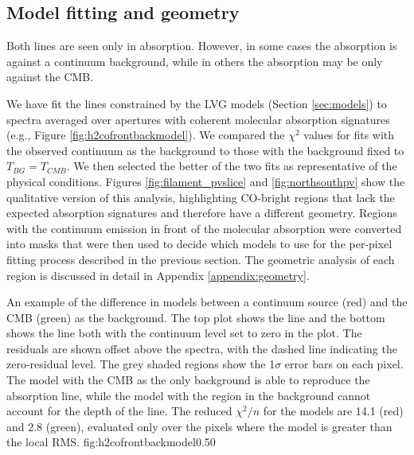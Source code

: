 \subsection{Model fitting and geometry}
\label{sec:geometry}
Both \formaldehyde lines are seen only in absorption.  However, in some cases
the absorption is against a continuum background, while in others the
absorption may be only against the CMB.

We have fit the \formaldehyde lines constrained by the LVG models (Section
\ref{sec:models}) to spectra averaged over apertures with coherent molecular
absorption signatures (e.g., Figure \ref{fig:h2cofrontbackmodel}).  We compared
the $\chi^2$ values for fits with the observed continuum as the background to
those with the background fixed to $T_{BG} = T_{CMB}$.  We then selected the
better of the two fits as representative of the physical conditions.  Figures
\ref{fig:filament_pvslice} and \ref{fig:northsouthpv} show the qualitative
version of this analysis, highlighting CO-bright regions that lack the expected
\formaldehyde absorption signatures and therefore have a different geometry.
Regions with the continuum emission in front of the molecular absorption were
converted into masks that were then used to decide which models to use for the
per-pixel fitting process described in the previous section.  The geometric
analysis of each region is discussed in detail in Appendix
\ref{appendix:geometry}.

{An example of the difference in models between a continuum source (red) and
the CMB (green) as the background.  The top plot shows the \oneone line and the
bottom shows the \twotwo line both with the continuum level set to zero in the
plot.  The residuals are shown
offset above the spectra, with the dashed line indicating the zero-residual
level.  The grey shaded regions show the 1$\sigma$ error bars on each pixel.
The model with the CMB as the only
background is able to reproduce the absorption line, while the model with the
\hii region in the background cannot account for the depth of the \twotwo line.
The reduced $\chi^2/n$ for the models are 14.1 (red) and 2.8 (green), evaluated
only over the pixels where the model is greater than the local RMS.}
{fig:h2cofrontbackmodel}{0.5}{0}

